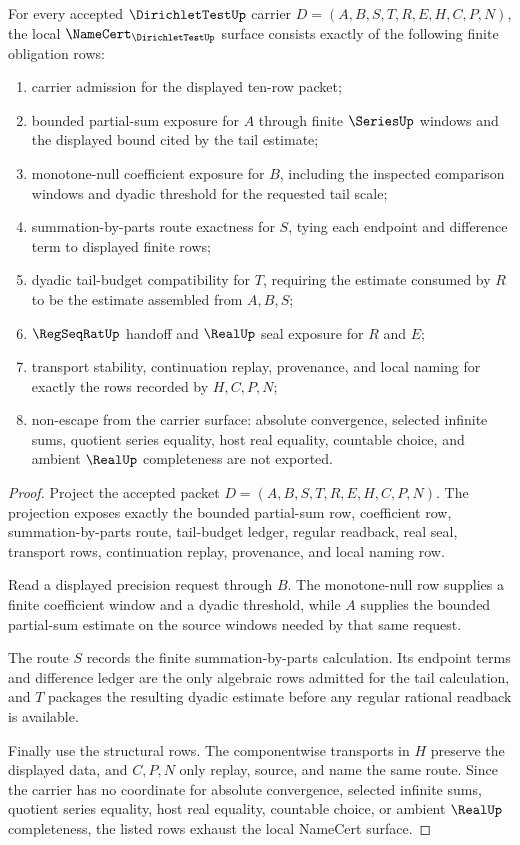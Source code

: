 \begin{theorem}
\label{thm:dirichlet-test-namecert-obligations}
For every accepted $\DirichletTestUp$ carrier $D=(A,B,S,T,R,E,H,C,P,N)$, the local $\NameCert_{\DirichletTestUp}$ surface consists exactly of the following finite obligation rows:
\begin{enumerate}
\item carrier admission for the displayed ten-row packet;
\item bounded partial-sum exposure for $A$ through finite $\SeriesUp$ windows and the displayed bound cited by the tail estimate;
\item monotone-null coefficient exposure for $B$, including the inspected comparison windows and dyadic threshold for the requested tail scale;
\item summation-by-parts route exactness for $S$, tying each endpoint and difference term to displayed finite rows;
\item dyadic tail-budget compatibility for $T$, requiring the estimate consumed by $R$ to be the estimate assembled from $A,B,S$;
\item $\RegSeqRatUp$ handoff and $\RealUp$ seal exposure for $R$ and $E$;
\item transport stability, continuation replay, provenance, and local naming for exactly the rows recorded by $H,C,P,N$;
\item non-escape from the carrier surface: absolute convergence, selected infinite sums, quotient series equality, host real equality, countable choice, and ambient $\RealUp$ completeness are not exported.
\end{enumerate}
\end{theorem}
\begin{proof}
Project the accepted packet $D=(A,B,S,T,R,E,H,C,P,N)$. The projection exposes exactly the bounded partial-sum row, coefficient row, summation-by-parts route, tail-budget ledger, regular readback, real seal, transport rows, continuation replay, provenance, and local naming row.

Read a displayed precision request through $B$. The monotone-null row supplies a finite coefficient window and a dyadic threshold, while $A$ supplies the bounded partial-sum estimate on the source windows needed by that same request.

The route $S$ records the finite summation-by-parts calculation. Its endpoint terms and difference ledger are the only algebraic rows admitted for the tail calculation, and $T$ packages the resulting dyadic estimate before any regular rational readback is available.

Finally use the structural rows. The componentwise transports in $H$ preserve the displayed data, and $C,P,N$ only replay, source, and name the same route. Since the carrier has no coordinate for absolute convergence, selected infinite sums, quotient series equality, host real equality, countable choice, or ambient $\RealUp$ completeness, the listed rows exhaust the local NameCert surface.
\end{proof}

